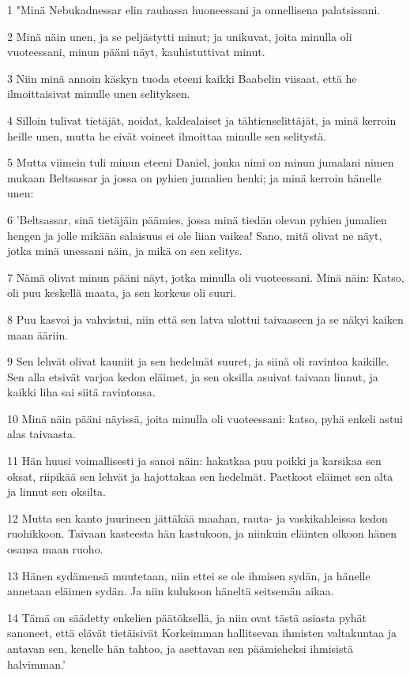 \par 1 "Minä Nebukadnessar elin rauhassa huoneessani ja onnellisena palatsissani.
\par 2 Minä näin unen, ja se peljästytti minut; ja unikuvat, joita minulla oli vuoteessani, minun pääni näyt, kauhistuttivat minut.
\par 3 Niin minä annoin käskyn tuoda eteeni kaikki Baabelin viisaat, että he ilmoittaisivat minulle unen selityksen.
\par 4 Silloin tulivat tietäjät, noidat, kaldealaiset ja tähtienselittäjät, ja minä kerroin heille unen, mutta he eivät voineet ilmoittaa minulle sen selitystä.
\par 5 Mutta viimein tuli minun eteeni Daniel, jonka nimi on minun jumalani nimen mukaan Beltsassar ja jossa on pyhien jumalien henki; ja minä kerroin hänelle unen:
\par 6 'Beltsassar, sinä tietäjäin päämies, jossa minä tiedän olevan pyhien jumalien hengen ja jolle mikään salaisuus ei ole liian vaikea! Sano, mitä olivat ne näyt, jotka minä unessani näin, ja mikä on sen selitys.
\par 7 Nämä olivat minun pääni näyt, jotka minulla oli vuoteessani. Minä näin: Katso, oli puu keskellä maata, ja sen korkeus oli suuri.
\par 8 Puu kasvoi ja vahvistui, niin että sen latva ulottui taivaaseen ja se näkyi kaiken maan ääriin.
\par 9 Sen lehvät olivat kauniit ja sen hedelmät suuret, ja siinä oli ravintoa kaikille. Sen alla etsivät varjoa kedon eläimet, ja sen oksilla asuivat taivaan linnut, ja kaikki liha sai siitä ravintonsa.
\par 10 Minä näin pääni näyissä, joita minulla oli vuoteessani: katso, pyhä enkeli astui alas taivaasta.
\par 11 Hän huusi voimallisesti ja sanoi näin: hakatkaa puu poikki ja karsikaa sen oksat, riipikää sen lehvät ja hajottakaa sen hedelmät. Paetkoot eläimet sen alta ja linnut sen oksilta.
\par 12 Mutta sen kanto juurineen jättäkää maahan, rauta- ja vaskikahleissa kedon ruohikkoon. Taivaan kasteesta hän kastukoon, ja niinkuin eläinten olkoon hänen osansa maan ruoho.
\par 13 Hänen sydämensä muutetaan, niin ettei se ole ihmisen sydän, ja hänelle annetaan eläimen sydän. Ja niin kulukoon häneltä seitsemän aikaa.
\par 14 Tämä on säädetty enkelien päätöksellä, ja niin ovat tästä asiasta pyhät sanoneet, että elävät tietäisivät Korkeimman hallitsevan ihmisten valtakuntaa ja antavan sen, kenelle hän tahtoo, ja asettavan sen päämieheksi ihmisistä halvimman.'
